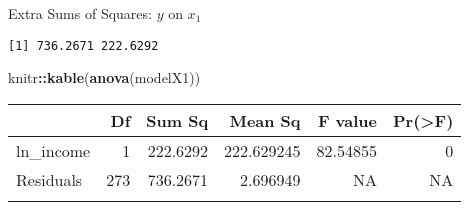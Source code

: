\documentclass[
  ignorenonframetext,
]{beamer}
\newenvironment{Shaded}{\begin{snugshade}}{\end{snugshade}}
\newcommand{\DecValTok}[1]{\textcolor[rgb]{0.00,0.00,0.81}{#1}}
\newcommand{\FunctionTok}[1]{\textcolor[rgb]{0.13,0.29,0.53}{\textbf{#1}}}
\newcommand{\NormalTok}[1]{#1}
\newcommand{\OtherTok}[1]{\textcolor[rgb]{0.56,0.35,0.01}{#1}}
\newcommand{\SpecialCharTok}[1]{\textcolor[rgb]{0.81,0.36,0.00}{\textbf{#1}}}
\begin{document}
\begin{frame}[fragile]{Extra Sums of Squares: \(y\) on \(x_1\)}
\protect\hypertarget{extra-sums-of-squares-y-on-x_1-1}{}
\normalsize

\begin{Shaded}
\end{Shaded}

\begin{verbatim}
[1] 736.2671 222.6292
\end{verbatim}

\begin{Shaded}
\begin{Highlighting}[]
\NormalTok{knitr}\SpecialCharTok{::}\FunctionTok{kable}\NormalTok{(}\FunctionTok{anova}\NormalTok{(modelX1))}
\end{Highlighting}
\end{Shaded}

\begin{longtable}[]{@{}lrrrrr@{}}
\toprule\noalign{}
& Df & Sum Sq & Mean Sq & F value & Pr(\textgreater F) \\
\midrule\noalign{}
\endhead
ln\_income & 1 & 222.6292 & 222.629245 & 82.54855 & 0 \\
Residuals & 273 & 736.2671 & 2.696949 & NA & NA \\
\bottomrule\noalign{}
\end{longtable}

\normalsize
\end{frame}
\end{document}
